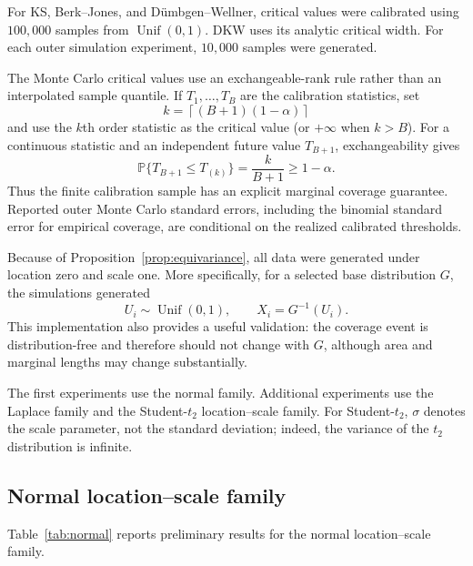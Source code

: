 \documentclass[11pt]{article}
\newcommand{\Pp}{\mathbb{P}}
\begin{document}
For KS, Berk--Jones, and Dümbgen--Wellner, critical values were
calibrated using $100{,}000$ samples from
$\operatorname{Unif}(0,1)$.  DKW uses its analytic critical width.
For each outer simulation experiment, $10{,}000$ samples were generated.

The Monte Carlo critical values use an exchangeable-rank rule rather
than an interpolated sample quantile.  If $T_1,\ldots,T_B$ are the
calibration statistics, set
\[
    k=\left\lceil(B+1)(1-\alpha)\right\rceil
\]
and use the $k$th order statistic as the critical value (or $+\infty$
when $k>B$).  For a continuous statistic and an independent future
value $T_{B+1}$, exchangeability gives
\[
    \Pp\{T_{B+1}\leq T_{(k)}\}=\frac{k}{B+1}\geq 1-\alpha.
\]
Thus the finite calibration sample has an explicit marginal coverage
guarantee.  Reported outer Monte Carlo standard errors, including the
binomial standard error for empirical coverage, are conditional on the
realized calibrated thresholds.

Because of Proposition~\ref{prop:equivariance}, all data were generated
under location zero and scale one.  More specifically, for a selected
base distribution $G$, the simulations generated
\[
    U_i\sim\operatorname{Unif}(0,1),
    \qquad
    X_i=G^{-1}(U_i).
\]
This implementation also provides a useful validation: the coverage
event is distribution-free and therefore should not change with $G$,
although area and marginal lengths may change substantially.

The first experiments use the normal family.  Additional experiments
use the Laplace family and the Student-$t_2$ location--scale family.
For Student-$t_2$, $\sigma$ denotes the scale parameter, not the
standard deviation; indeed, the variance of the $t_2$ distribution is
infinite.


\subsection{Normal location--scale family}

Table~\ref{tab:normal} reports preliminary results for the normal
location--scale family.
\end{document}
